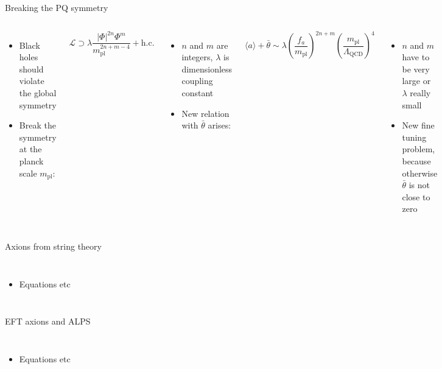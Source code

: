 \documentclass[aspectratio=1610, 9pt]{beamer}
\begin{document}
\begin{frame}{Breaking the PQ symmetry}
  \begin{columns}
    \column{\textwidth}
    \begin{itemize}
      \item Black holes should violate the global symmetry
      \item Break the symmetry at the planck scale $m_{\text{pl}}$:
    \end{itemize}
    \begin{equation*}
      \mathcal{L} \supset \lambda \frac{|\Phi|^{2n} \Phi^m}{m_{\text{pl}}^{2n+m-4}} + \text{h.c.}
    \end{equation*}
    \begin{itemize}
      \item $n$ and $m$ are integers, $\lambda$ is dimensionless coupling constant
      \item New relation with $\bar{\theta}$ arises:
    \end{itemize}
    \begin{equation*}
      \langle a \rangle + \bar{\theta} \sim \lambda \left( \frac{f_a}{m_{\text{pl}}} \right)^{2n+m} \left( \frac{m_{\text{pl}}}{\Lambda_{\text{QCD}}} \right)^4
    \end{equation*}
    \begin{itemize}
      \item $n$ and $m$ have to be very large or $\lambda$ really small
      \item New fine tuning problem, because otherwise $\bar{\theta}$ is not close to zero
    \end{itemize}
  \end{columns} 
\end{frame}


\begin{frame}{Axions from string theory}
  \begin{columns}
    \column{\textwidth}
    \begin{itemize}
      \item Equations etc
    \end{itemize}
  \end{columns} 
\end{frame}

\begin{frame}{EFT axions and ALPS}
  \begin{columns}
    \column{\textwidth}
    \begin{itemize}
      \item Equations etc
    \end{itemize}
  \end{columns} 
\end{frame}
\end{document}
